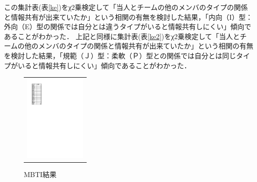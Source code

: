 \documentclass[uplatex]{jsarticle}
\begin{document}
この集計表(表\ref{ke})をχ2乗検定して「当人とチームの他のメンバのタイプの関係と情報共有が出来ていたか」という相関の有無を検討した結果，「内向（I）型：外向（E）型の関係では自分とは違うタイプがいると情報共有しにくい」傾向であることがわかった．
上記と同様に集計表(表\ref{ke2})をχ2乗検定して「当人とチームの他のメンバのタイプの関係と情報共有が出来ていたか」という相関の有無を検討した結果，「規範（Ｊ）型：柔軟（Ｐ）型との関係では自分とは同じタイプがいると情報共有しにくい」傾向であることがわかった．
\begin{figure}[h]
   \begin{tabular}{c}

      \begin{minipage}{0.33\hsize}
        \begin{center}
   \includegraphics[width=3cm,clip]{wariai.pdf}
  \caption{MBTI結果}
  \label{wariai}
  \end{center}
 \end{minipage}


\end{tabular}
\end{figure}
\end{document}
